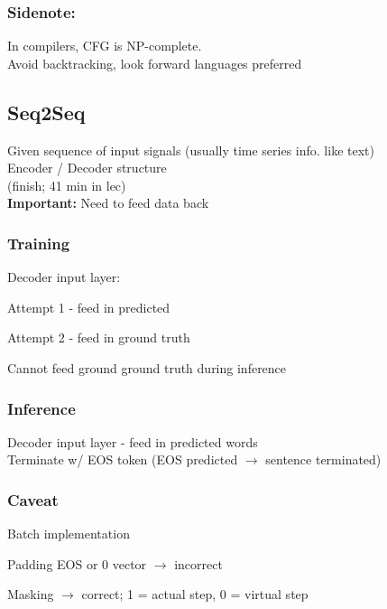 \documentclass{article}
\begin{document}
\subsubsection{Sidenote:}
In compilers, CFG is NP-complete.
\\
Avoid backtracking, look forward languages preferred

\subsection{Seq2Seq}
Given sequence of input signals (usually time series info. like text)
\\
Encoder / Decoder structure
\\
(finish; 41 min in lec)
\\
\textbf{Important:} Need to feed data back

\subsubsection{Training}
Decoder input layer:
\begin{list}{}{}
    \item Attempt 1 - feed in predicted
    \item Attempt 2 - feed in ground truth
\end{list}
Cannot feed ground ground truth during inference

\subsubsection{Inference}
Decoder input layer - feed in predicted words
\\
Terminate w/ EOS token (EOS predicted $\to$ sentence terminated)

\subsubsection{Caveat}
Batch implementation
\begin{list}{}{}
    \item Padding EOS or 0 vector $\to$ incorrect
    \item Masking $\to$ correct; 1 = actual step, 0 = virtual step
\end{list}
\end{document}

